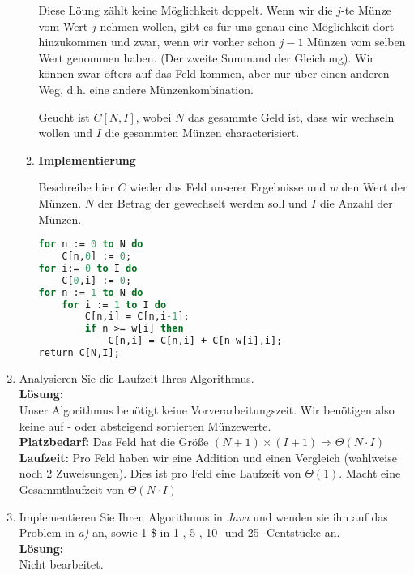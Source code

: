 \documentclass[11pt,a4paper,ngerman]{article}
\begin{document}
\begin{enumerate}[\bfseries (a)]
\begin{enumerate}
Diese Löung zählt keine Möglichkeit doppelt.  Wenn wir die $j$-te Münze vom Wert $j$ nehmen wollen, gibt es für uns genau eine Möglichkeit dort hinzukommen und zwar, wenn wir vorher schon $j-1$ Münzen vom selben Wert genommen haben. (Der zweite Summand der Gleichung). Wir können zwar öfters auf das Feld kommen, aber nur über einen anderen Weg, d.h. eine andere Münzenkombination.

Geucht ist $C[N,I]$, wobei $N$ das gesammte Geld ist, dass wir wechseln wollen und $I$ die gesammten Münzen characterisiert.

\item{\bfseries Implementierung}

Beschreibe hier $C$ wieder das Feld unserer Ergebnisse und $w$ den Wert der Münzen.
$N$ der Betrag der gewechselt werden soll und $I$ die Anzahl der Münzen.

\begin{lstlisting}[language=Pascal]
for n := 0 to N do
	C[n,0] := 0;
for i:= 0 to I do
	C[0,i] := 0;
for n := 1 to N do
	for i := 1 to I do
		C[n,i] = C[n,i-1];
		if n >= w[i] then
			C[n,i] = C[n,i] + C[n-w[i],i];
return C[N,I];
\end{lstlisting}

\end{enumerate}


\item Analysieren Sie die Laufzeit Ihres Algorithmus.\\

\textbf{Lösung:}\\

Unser Algorithmus benötigt keine Vorverarbeitungszeit. Wir benötigen also keine auf - oder absteigend sortierten Münzewerte.\\
\textbf{Platzbedarf:} Das Feld hat die Größe $(N+1)\times(I+1) \Rightarrow \Theta (N \cdot I)$\\
\textbf{Laufzeit:} Pro Feld haben wir eine Addition und einen Vergleich (wahlweise noch 2 Zuweisungen). Dies ist pro Feld eine Laufzeit von $\Theta (1)$. Macht eine Gesammtlaufzeit von $\Theta (N \cdot I)$


\item Implementieren Sie Ihren Algorithmus in \emph{Java} und wenden sie ihn auf das Problem in \emph{a)} an, sowie 1 \$ in 1-, 5-, 10- und 25- Centstücke an.\\

\textbf{Lösung:}\\

Nicht bearbeitet.

\end{enumerate}
\end{document}
